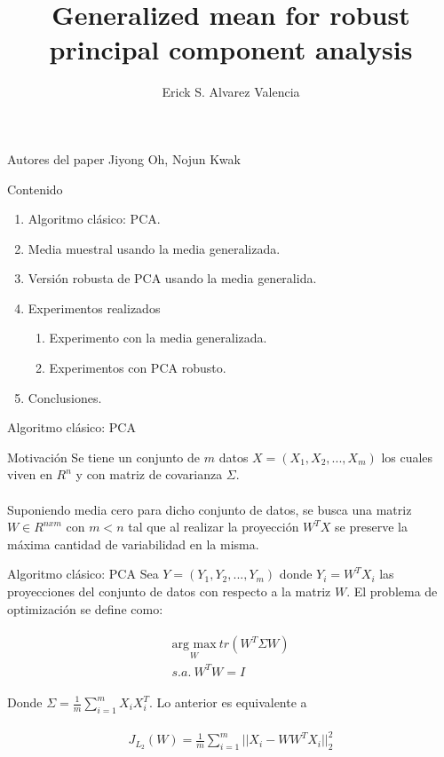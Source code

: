 \documentclass{beamer}
\title{Generalized mean for robust principal component analysis}
\author{Erick S. Alvarez Valencia}
\begin{document}
\begin{frame}
	\maketitle
	\begin{block}{Autores del paper}
		Jiyong Oh, Nojun Kwak
	\end{block}
\end{frame}

\begin{frame}{Contenido}
	\begin{enumerate}
		\item Algoritmo clásico: PCA.
		\item Media muestral usando la media generalizada.
		\item Versión robusta de PCA usando la media generalida.
		\item Experimentos realizados
		\begin{enumerate}
			\item Experimento con la media generalizada.
			\item Experimentos con PCA robusto.
		\end{enumerate}
		\item Conclusiones.
	\end{enumerate}
\end{frame}

\begin{frame}{Algoritmo clásico: PCA}
	\begin{block}{Motivación}
		Se tiene un conjunto de $m$ datos $X = (X_1, X_2, ..., X_m)$ los cuales viven en $R^n$ y con matriz de covarianza $\Sigma$.\\~\\
		
		Suponiendo media cero para dicho conjunto de datos, se busca una matriz $W \in R^{nxm}$ con $m < n$ tal que al realizar la proyección $W^T X$ se preserve la máxima cantidad de variabilidad en la misma.
	\end{block}
\end{frame}

\begin{frame}{Algoritmo clásico: PCA}
	Sea $Y = (Y_1, Y_2, ..., Y_m)$ donde $Y_i = W^T X_i$ las proyecciones del conjunto de datos con respecto a la matriz $W$. El problema de optimización se define como:
	
	\begin{align}
	\label{eqn:eqlabel}
	\begin{split}
	\underset{W}{\text{arg max}}\ tr(W^T \Sigma W)\\
		s.a.\ W^T W = I
	\end{split}
	\end{align}
	
	Donde $\Sigma = \frac{1}{m} \sum_{i = 1}^m X_i X_i^T$. Lo anterior es equivalente a
	
	\begin{align}
	\label{eqn:eqlabel}
	\begin{split}
		J_{L_2}(W) = \frac{1}{m} \sum_{i = 1}^m ||X_i - W W^T X_i||_2^2
	\end{split}
	\end{align}
\end{frame}
\end{document}
